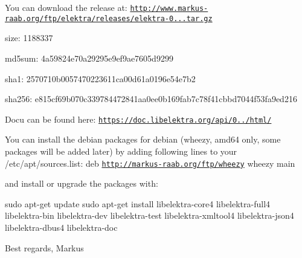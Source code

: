 You can download the release at\+: \href{http://www.markus-raab.org/ftp/elektra/releases/elektra-0.8.6.tar.gz}{\tt http\+://www.\+markus-\/raab.\+org/ftp/elektra/releases/elektra-\/0...\+tar.\+gz}


\begin{DoxyItemize}
\item size\+: 1188337
\item md5sum\+: 4a59824e70a29295e9ef9ae7605d9299
\item sha1\+: 2570710b0057470223611ca00d61a0196e54e7b2
\item sha256\+: e815cf69b070c339784472841aa0ee0b169fab7c78f41cbbd7044f53fa9ed216
\end{DoxyItemize}

Docu can be found here\+: \href{https://doc.libelektra.org/api/0.8.6/html/}{\tt https\+://doc.\+libelektra.\+org/api/0../html/}

You can install the debian packages for debian (wheezy, amd64 only, some packages will be added later) by adding following lines to your /etc/apt/sources.list\+: deb \href{http://markus-raab.org/ftp/wheezy}{\tt http\+://markus-\/raab.\+org/ftp/wheezy} wheezy main

and install or upgrade the packages with\+:


\begin{DoxyCode}
sudo apt-get update
sudo apt-get install libelektra-core4 libelektra-full4 libelektra-bin libelektra-dev libelektra-test
       libelektra-xmltool4 libelektra-json4 libelektra-dbus4 libelektra-doc
\end{DoxyCode}


Best regards, Markus 